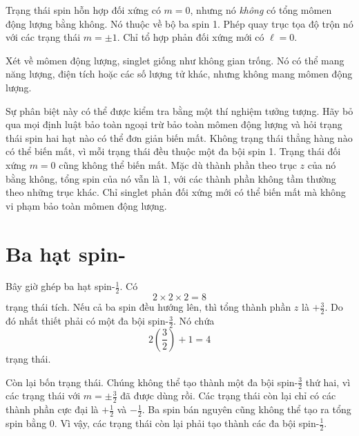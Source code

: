 Trạng thái spin hỗn hợp đối xứng có \(m=0\), nhưng nó \emph{không} có tổng mômen động lượng bằng không. Nó thuộc về bộ ba spin 1. Phép quay trục tọa độ trộn nó với các trạng thái \(m=\pm1\). Chỉ tổ hợp phản đối xứng mới có \(\ell=0\).

Xét về mômen động lượng, singlet giống như không gian trống. Nó có thể mang năng lượng, điện tích hoặc các số lượng tử khác, nhưng không mang mômen động lượng.

Sự phân biệt này có thể được kiểm tra bằng một thí nghiệm tưởng tượng. Hãy bỏ qua mọi định luật bảo toàn ngoại trừ bảo toàn mômen động lượng và hỏi trạng thái spin hai hạt nào có thể đơn giản biến mất. Không trạng thái thẳng hàng nào có thể biến mất, vì mỗi trạng thái đều thuộc một đa bội spin 1. Trạng thái đối xứng \(m=0\) cũng không thể biến mất. Mặc dù thành phần theo trục \(z\) của nó bằng không, tổng spin của nó vẫn là 1, với các thành phần không tầm thường theo những trục khác. Chỉ singlet phản đối xứng mới có thể biến mất mà không vi phạm bảo toàn mômen động lượng.

\begin{classroomqa}
\end{classroomqa}

\section{Ba hạt spin-}

Bây giờ ghép ba hạt spin-\(\tfrac12\). Có
\begin{equation}
2\times2\times2=8
\end{equation}
trạng thái tích. Nếu cả ba spin đều hướng lên, thì tổng thành phần \(z\) là \(+\tfrac32\). Do đó nhất thiết phải có một đa bội spin-\(\tfrac32\). Nó chứa
\begin{equation}
2\left(\frac32\right)+1=4
\end{equation}
trạng thái.

Còn lại bốn trạng thái. Chúng không thể tạo thành một đa bội spin-\(\tfrac32\) thứ hai, vì các trạng thái với \(m=\pm\tfrac32\) đã được dùng rồi. Các trạng thái còn lại chỉ có các thành phần cực đại là \(+\tfrac12\) và \(-\tfrac12\). Ba spin bán nguyên cũng không thể tạo ra tổng spin bằng 0. Vì vậy, các trạng thái còn lại phải tạo thành các đa bội spin-\(\tfrac12\).

